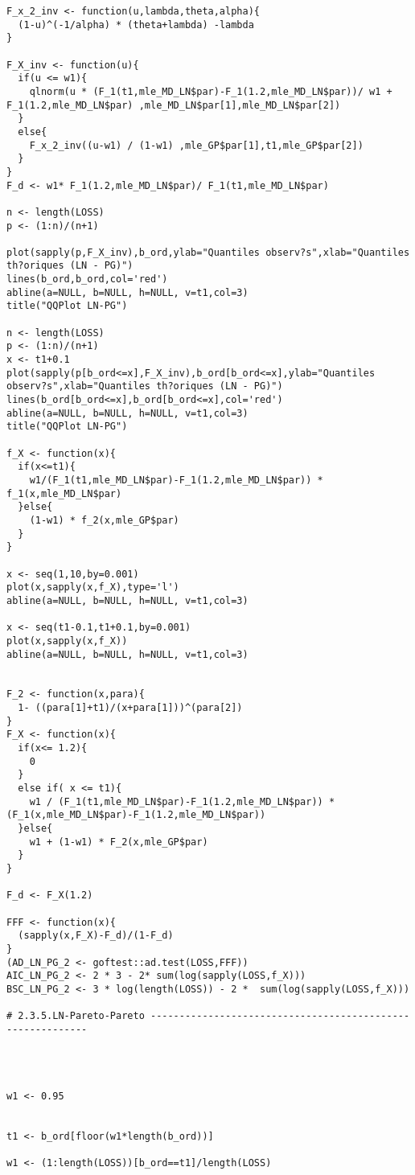 \begin{verbatim}
F_x_2_inv <- function(u,lambda,theta,alpha){
  (1-u)^(-1/alpha) * (theta+lambda) -lambda
}

F_X_inv <- function(u){
  if(u <= w1){
    qlnorm(u * (F_1(t1,mle_MD_LN$par)-F_1(1.2,mle_MD_LN$par))/ w1 + F_1(1.2,mle_MD_LN$par) ,mle_MD_LN$par[1],mle_MD_LN$par[2])
  }
  else{
    F_x_2_inv((u-w1) / (1-w1) ,mle_GP$par[1],t1,mle_GP$par[2])
  }  
}
F_d <- w1* F_1(1.2,mle_MD_LN$par)/ F_1(t1,mle_MD_LN$par)

n <- length(LOSS)
p <- (1:n)/(n+1)

plot(sapply(p,F_X_inv),b_ord,ylab="Quantiles observ?s",xlab="Quantiles th?oriques (LN - PG)")
lines(b_ord,b_ord,col='red')
abline(a=NULL, b=NULL, h=NULL, v=t1,col=3)
title("QQPlot LN-PG")

n <- length(LOSS)
p <- (1:n)/(n+1)
x <- t1+0.1
plot(sapply(p[b_ord<=x],F_X_inv),b_ord[b_ord<=x],ylab="Quantiles observ?s",xlab="Quantiles th?oriques (LN - PG)")
lines(b_ord[b_ord<=x],b_ord[b_ord<=x],col='red')
abline(a=NULL, b=NULL, h=NULL, v=t1,col=3)
title("QQPlot LN-PG")

f_X <- function(x){
  if(x<=t1){
    w1/(F_1(t1,mle_MD_LN$par)-F_1(1.2,mle_MD_LN$par)) * f_1(x,mle_MD_LN$par)
  }else{
    (1-w1) * f_2(x,mle_GP$par)
  }
}

x <- seq(1,10,by=0.001)
plot(x,sapply(x,f_X),type='l')
abline(a=NULL, b=NULL, h=NULL, v=t1,col=3)

x <- seq(t1-0.1,t1+0.1,by=0.001)
plot(x,sapply(x,f_X))
abline(a=NULL, b=NULL, h=NULL, v=t1,col=3)


F_2 <- function(x,para){
  1- ((para[1]+t1)/(x+para[1]))^(para[2])
}
F_X <- function(x){
  if(x<= 1.2){
    0
  }
  else if( x <= t1){
    w1 / (F_1(t1,mle_MD_LN$par)-F_1(1.2,mle_MD_LN$par)) * (F_1(x,mle_MD_LN$par)-F_1(1.2,mle_MD_LN$par))
  }else{
    w1 + (1-w1) * F_2(x,mle_GP$par)
  }
}

F_d <- F_X(1.2)

FFF <- function(x){
  (sapply(x,F_X)-F_d)/(1-F_d)
}
(AD_LN_PG_2 <- goftest::ad.test(LOSS,FFF))
AIC_LN_PG_2 <- 2 * 3 - 2* sum(log(sapply(LOSS,f_X)))
BSC_LN_PG_2 <- 3 * log(length(LOSS)) - 2 *  sum(log(sapply(LOSS,f_X)))

# 2.3.5.LN-Pareto-Pareto -----------------------------------------------------------




w1 <- 0.95


t1 <- b_ord[floor(w1*length(b_ord))]

w1 <- (1:length(LOSS))[b_ord==t1]/length(LOSS)


\end{verbatim}
